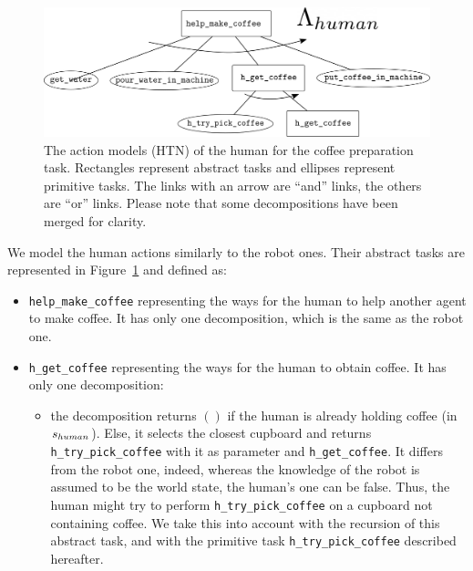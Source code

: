 \documentclass[a4paper,11pt,twoside]{StyleThese}
\begin{document}
\begin{figure}[hbtp]
\centering
\includegraphics[width=\textwidth]{figures/chapter4/HTN_h_coffee.png}
\caption{The action models (HTN) of the human for the coffee preparation task. Rectangles represent abstract tasks and ellipses represent primitive tasks. The links with an arrow are ``and'' links, the others are ``or'' links. Please note that some decompositions have been merged for clarity.}
\label{fig:chap4hhtncoffee}
\end{figure}

We model the human actions similarly to the robot ones. Their abstract tasks are represented in Figure~\ref{fig:chap4hhtncoffee} and defined as:
\begin{itemize}
\item \verb'help_make_coffee' representing the ways for the human to help another agent to make coffee. It has only one decomposition, which is the same as the robot one.
\item \verb'h_get_coffee' representing the ways for the human to obtain coffee. It has only one decomposition:
	\begin{itemize}
	\item the decomposition returns $()$ if the human is already holding coffee (in $s_{human}$). Else, it selects the closest cupboard and returns \verb'h_try_pick_coffee' with it as parameter and \verb'h_get_coffee'. It differs from the robot one, indeed, whereas the knowledge of the robot is assumed to be the world state, the human's one can be false. Thus, the human might try to perform \verb'h_try_pick_coffee' on a cupboard not containing coffee. We take this into account with the recursion of this abstract task, and with the primitive task \verb'h_try_pick_coffee' described hereafter.
	\end{itemize}
\end{itemize}
\end{document}
